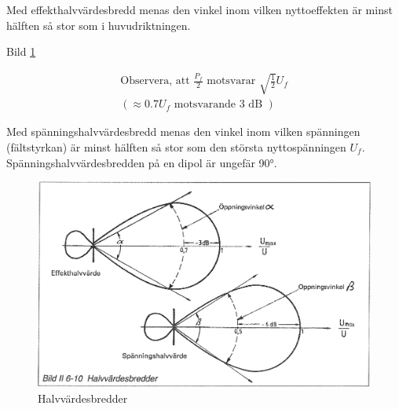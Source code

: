Med effekthalvvärdesbredd menas den vinkel inom vilken nyttoeffekten
är minst hälften så stor som i huvudriktningen.

Bild \ref{fig:bildII6-10}

\begin{gather*}
  \text{Observera, att } \frac{P_f}{2} \text{ motsvarar }
  \sqrt{\frac{1}{2}}U_f \\
  ( \approx 0.7 U_f \text{ motsvarande 3 dB })
\end{gather*}

Med spänningshalvvärdesbredd menas den vinkel inom vilken spänningen
(fältstyrkan) är minst hälften så stor som den största nyttospänningen
\(U_f\). Spänningshalvvärdesbredden på en dipol är ungefär 90°.

\begin{figure}
  \includegraphics[width=\textwidth]{images/bild_2_6-10}
  \caption{Halvvärdesbredder}
  \label{fig:bildII6-10}
\end{figure}
